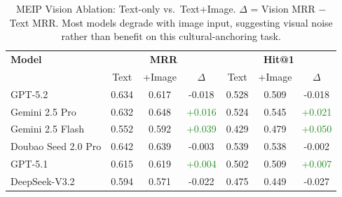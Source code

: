\begin{table}[t]
\centering
\small
\caption{MEIP Vision Ablation: Text-only vs.\ Text+Image. $\Delta$ = Vision MRR $-$ Text MRR. Most models degrade with image input, suggesting visual noise rather than benefit on this cultural-anchoring task.}
\label{tab:vision-ablation}
\begin{tabular}{lccc|ccc}
\toprule
\textbf{Model} & \multicolumn{3}{c|}{\textbf{MRR}} & \multicolumn{3}{c}{\textbf{Hit@1}} \\
 & Text & +Image & $\Delta$ & Text & +Image & $\Delta$ \\
\midrule
GPT-5.2 & 0.634 & 0.617 & \textcolor{BrickRed}{-0.018} & 0.528 & 0.509 & \textcolor{BrickRed}{-0.018} \\
Gemini 2.5 Pro & 0.632 & 0.648 & \textcolor{ForestGreen}{+0.016} & 0.524 & 0.545 & \textcolor{ForestGreen}{+0.021} \\
Gemini 2.5 Flash & 0.552 & 0.592 & \textcolor{ForestGreen}{+0.039} & 0.429 & 0.479 & \textcolor{ForestGreen}{+0.050} \\
Doubao Seed 2.0 Pro & 0.642 & 0.639 & \textcolor{BrickRed}{-0.003} & 0.539 & 0.538 & \textcolor{BrickRed}{-0.002} \\
GPT-5.1 & 0.615 & 0.619 & \textcolor{ForestGreen}{+0.004} & 0.502 & 0.509 & \textcolor{ForestGreen}{+0.007} \\
DeepSeek-V3.2 & 0.594 & 0.571 & \textcolor{BrickRed}{-0.022} & 0.475 & 0.449 & \textcolor{BrickRed}{-0.027} \\
\bottomrule
\end{tabular}
\end{table}